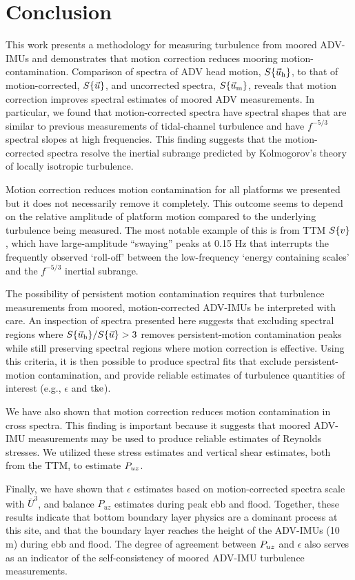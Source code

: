 
\section{Conclusion}
\label{sec:conclusion}
 
This work presents a methodology for measuring turbulence from moored ADV-IMUs and demonstrates that motion correction reduces mooring motion-contamination. Comparison of spectra of ADV head motion, $S\{\vec{u}_{\mathrm{h}}\}$, to that of motion-corrected, $S\{\vec{u}\}$, and uncorrected spectra, $S\{\vec{u}_{\mathrm{m}}\}$, reveals that motion correction improves spectral estimates of moored ADV measurements. In particular, we found that motion-corrected spectra have spectral shapes that are similar to previous measurements of tidal-channel turbulence and have $f^{-5/3}$ spectral slopes at high frequencies. This finding suggests that the motion-corrected spectra resolve the inertial subrange predicted by Kolmogorov's theory of locally isotropic turbulence.

Motion correction reduces motion contamination for all platforms we presented but it does not necessarily remove it completely. This outcome seems to depend on the relative amplitude of platform motion compared to the underlying turbulence being measured. The most notable example of this is from TTM $S\{v\}$, which have large-amplitude ``swaying'' peaks at 0.15 Hz that interrupts the frequently observed `roll-off' between the low-frequency `energy containing scales' and the $f^{-5/3}$ inertial subrange.

The possibility of persistent motion contamination requires that turbulence measurements from moored, motion-corrected ADV-IMUs be interpreted with care. An inspection of spectra presented here suggests that excluding spectral regions where $S\{\vec{u}_{\mathrm{h}}\} / S\{\vec{u}\} > 3$ removes persistent-motion contamination peaks while still preserving spectral regions where motion correction is effective. Using this criteria, it is then possible to produce spectral fits that exclude persistent-motion contamination, and provide reliable estimates of turbulence quantities of interest (e.g., $\epsilon$ and $\mathrm{tke}$).

We have also shown that motion correction reduces motion contamination in cross spectra. This finding is important because it suggests that moored ADV-IMU measurements may be used to produce reliable estimates of Reynolds stresses. We utilized these stress estimates and vertical shear estimates, both from the TTM, to estimate $P_{uz}$. 

Finally, we have shown that $\epsilon$ estimates based on motion-corrected spectra scale with $\bar U^3$, and balance $P_{uz}$ estimates during peak ebb and flood. Together, these results indicate that bottom boundary layer physics are a dominant process at this site, and that the boundary layer reaches the height of the ADV-IMUs (10 m) during ebb and flood. The degree of agreement between $P_{uz}$ and $\epsilon$ also serves as an indicator of the self-consistency of moored ADV-IMU turbulence measurements. 

